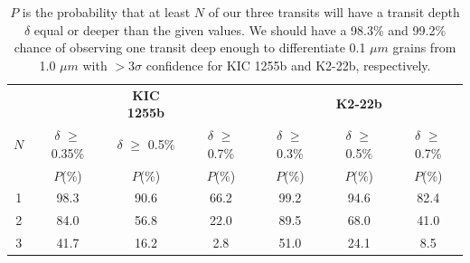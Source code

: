 \documentclass[letterpaper,12pt]{article}
\begin{document}
\begin{table}[b]
\centering
\begin{tabular}{|c | c c c| c c c|} 
\hline\hline 

	   	&     				& {\bf KIC 1255b}		&				&				& {\bf K2-22b}		&		  		\\
  $N$   	&    $\delta$ $\ge$ 0.35\%	& $\delta$ $\ge$ 0.5\%		& $\delta$ $\ge$ 0.7\%		& $\delta$ $\ge$ 0.3\%		& $\delta$ $\ge$ 0.5\%		& $\delta$ $\ge$ 0.7\%		\\
 	   	&    $P$(\%)              & $P$(\%)				& $P$(\%) 		& $P$(\%)			& $P$(\%) 		& $P$(\%)			\\
\hline 
\hline
	1	&	98.3			& 90.6 				& 66.2			& 99.2			& 94.6			& 82.4	\\
	2	& 	84.0			& 56.8				& 22.0			& 89.5			& 68.0			& 41.0	\\
	3	& 	41.7			& 16.2				& 2.8				& 51.0			& 24.1			& 8.5		\\

\hline 
\end{tabular}
\caption{$P$ is the probability that at least $N$ of our three
transits will have a transit depth $\delta$ equal or deeper than the given values. We should have a 98.3\% and 99.2\% chance of observing one transit deep enough to 
differentiate 0.1 $\mu m$ grains from 1.0 $\mu m$ with $>$3$\sigma$ confidence
for KIC 1255b and K2-22b, respectively.}
\label{tab:probabilities}
\end{table}





\begingroup
\renewcommand{\section}[2]{}%

\endgroup
\end{document}
